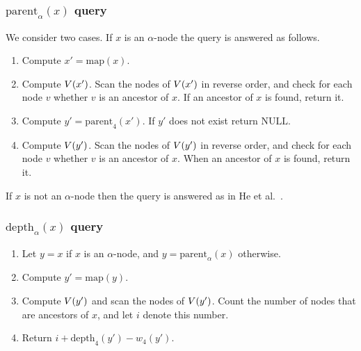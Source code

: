 \documentclass[12pt]{article}
\newcommand{\NULL}{\mathrm{NULL}}
\newcommand{\depthb}{\mathrm{depth}}
\newcommand{\parentb}{\mathrm{parent}}
\newcommand{\depth}[2]{\depthb_{#1}(#2)}
\newcommand{\parent}[2]{\parentb_{#1}(#2)}
\newcommand{\idxeq}{4}
\newcommand{\map}[1]{\mathrm{map}(#1)}
\begin{document}
\subsubsection{$\parent{\alpha}{x}$ query}
We consider two cases.
If $x$ is an $\alpha$-node the query is answered as follows.
\begin{enumerate}
\item Compute $x'=\map{x}$.
\item Compute $V(x')$. Scan the nodes of $V(x')$ in reverse order,
and check for each node $v$ whether $v$ is an ancestor of $x$.
If an ancestor of $x$ is found, return it.
\item
Compute $y' = \parent{\idxeq}{x'}$.
If $y'$ does not exist return $\NULL$.
\item
Compute $V(y')$. Scan the nodes of $V(y')$ in reverse order,
and check for each node $v$ whether $v$ is an ancestor of $x$.
When an ancestor of $x$ is found, return it.
\end{enumerate}
If $x$ is not an $\alpha$-node then the query is answered as
in He et al.~\cite{HeMZ12}.




\subsubsection{$\depth{\alpha}{x}$ query}
\begin{enumerate}
\item
Let $y=x$ if $x$ is an $\alpha$-node, and $y=\parent{\alpha}{x}$ otherwise.
\item
Compute $y' = \map{y}$.
\item
Compute $V(y')$ and scan the nodes of $V(y')$.
Count the number of nodes that are ancestors of $x$,
and let $i$ denote this number.
\item
Return $i + \depth{\idxeq}{y'}-w_{\idxeq}(y')$.
\end{enumerate}
\end{document}
